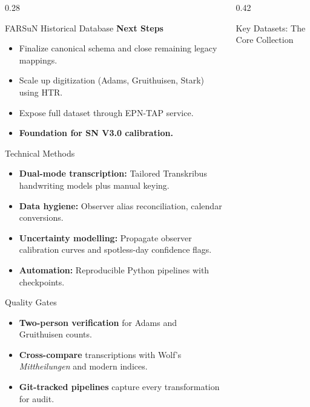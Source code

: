 \documentclass[final]{beamer}
\begin{document}
\begin{frame}[t]
\begin{columns}[t,totalwidth=0.98\paperwidth]
\begin{column}{0.28\paperwidth}
\begin{fancyblock}{FARSuN Historical Database}
    \textbf{Next Steps}
    \begin{itemize}
        \item Finalize canonical schema and close remaining legacy mappings.
        \item Scale up digitization (Adams, Gruithuisen, Stark) using HTR.
        \item Expose full dataset through EPN-TAP service.
        \item \textbf{Foundation for SN V3.0 calibration.}
    \end{itemize}
    \end{fancyblock}

    \begin{fancyblock}{Technical Methods}
    \begin{itemize}
      \item \textbf{Dual-mode transcription:} Tailored Transkribus handwriting models plus manual keying.
      \item \textbf{Data hygiene:} Observer alias reconciliation, calendar conversions.
      \item \textbf{Uncertainty modelling:} Propagate observer calibration curves and spotless-day confidence flags.
      \item \textbf{Automation:} Reproducible Python pipelines with checkpoints.
    \end{itemize}
    \end{fancyblock}
    
    \begin{fancyblock}{Quality Gates}
    \begin{itemize}
      \item \textbf{Two-person verification} for Adams and Gruithuisen counts.
      \item \textbf{Cross-compare} transcriptions with Wolf's \emph{Mittheilungen} and modern indices.
      \item \textbf{Git-tracked pipelines} capture every transformation for audit.
    \end{itemize}
    \end{fancyblock}

\end{column}


\begin{column}{0.42\paperwidth}

    \begin{fancyblock}{Key Datasets: The Core Collection}
    

\end{fancyblock}
\end{column}
\end{columns}
\end{frame}
\end{document}
